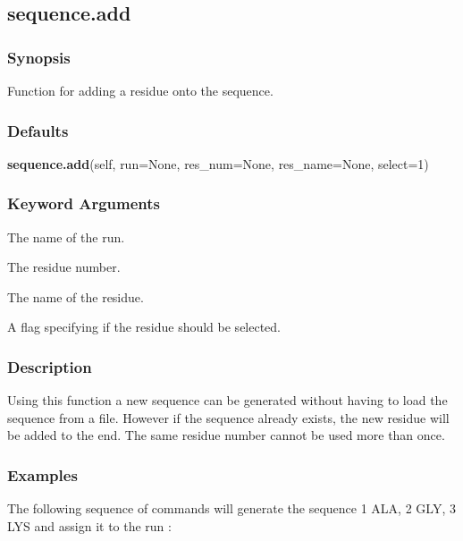  \subsection{sequence.add} 

  
 \subsubsection{Synopsis} 

 Function for adding a residue onto the sequence. 
  

  
 \subsubsection{Defaults} 

 \textsf{\textbf{sequence.add}(self, run=None, res\_num=None, res\_name=None, select=1)} 

  
 \subsubsection{Keyword Arguments} 

   The name of the run.   

   The residue number.   

   The name of the residue.   

   A flag specifying if the residue should be selected.  

  

  
 \subsubsection{Description} 

 Using this function a new sequence can be generated without having to load the sequence from a file.  However if the sequence already exists, the new residue will be added to the end. The same residue number cannot be used more than once. 
  

  
 \subsubsection{Examples} 

 The following sequence of commands will generate the sequence 1 ALA, 2 GLY, 3 LYS and assign it to the run : 
  

